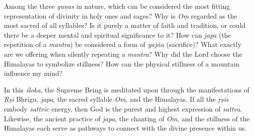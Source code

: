 \newpage
\begin{mananam}{}
\normalfont\mananamtext Among the three \emph{guṇas} in nature, which can be considered the most fitting representation of divinity in holy ones and sages?
Why is \emph{Oṃ} regarded as the most sacred of all syllables? Is it purely a matter of faith and tradition, or could there be a deeper mental and spiritual significance to it?
How can \emph{japa} (the repetition of a \emph{mantra}) be considered a form of \emph{yajña} (sacrifice)? What exactly are we offering when silently repeating a \emph{mantra}?
Why did the Lord choose the Himalayas to symbolize stillness? How can the physical stillness of a mountain influence my mind? 
\end{mananam}
\sreflect
\begin{inspiration}{}
\normalfont\mananamtext In this \emph{śloka}, the Supreme Being is meditated upon through the manifestations of \emph{Ṛṣi} Bhrigu, \emph{japa}, the sacred syllable \emph{Om}, and the Himalayas.
If all the \emph{ṛṣis} embody \emph{sattvic} energy, then God is the purest and highest expression of \emph{sattva}. Likewise, the ancient practice of \emph{japa}, the chanting of \emph{Om}, and the stillness of the Himalayas each serve as pathways to connect with the divine presence within us.
\end{inspiration}
\newpage

